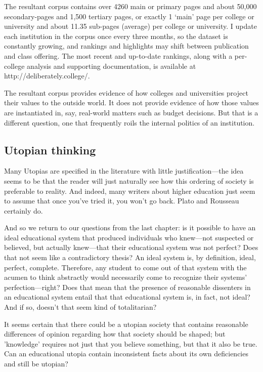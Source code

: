 The resultant corpus contains over 4260 main or primary pages and about 50,000 secondary-pages and 1,500 tertiary pages, or exactly 1 `main' page per college or university and about 11.35 sub-pages (average) per college or university. I update each institution in the corpus once every three months, so the dataset is constantly growing, and rankings and highlights may shift between publication and class offering. The most recent and up-to-date rankings, along with a per-college analysis and supporting documentation, is available at http:\slash \slash deliberately.college\slash . 

The resultant corpus provides evidence of how colleges and universities project their values to the outside world. It does not provide evidence of how those values are instantiated in, say, real-world matters such as budget decisions. But that is a different question, one that frequently roils the internal politics of an institution.

\subsection{Utopian thinking}
\label{utopianthinking}

 Many Utopias are specified in the literature with little justification---the idea seems to be that the reader will just naturally see how this ordering of society is preferable to reality. And indeed, many writers about higher education just seem to assume that once you've tried it, you won't go back. Plato and Rousseau certainly do.\begin{question}
And so we return to our questions from the last chapter: is it possible to have an ideal educational system that produced individuals who knew---not suspected or believed, but actually knew---that their educational system was not perfect?  Does that not seem like a contradictory thesis?  An ideal system is, by definition, ideal, perfect, complete.  Therefore, any student to come out of that system with the acumen to think abstractly would necessarily come to recognize their systems' perfection---right? Does that mean that the presence of reasonable dissenters in an educational system entail that that educational system is, in fact, not ideal? And if so, doesn't that seem kind of totalitarian?

It seems certain that there could be a utopian society that contains reasonable differences of opinion regarding how that society should be shaped; but 'knowledge' requires not just that you believe something, but that it also be true. Can an educational utopia contain inconsistent facts about its own deficiencies and still be utopian?\end{question}

